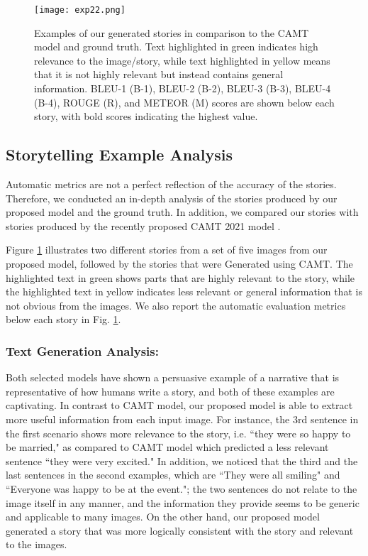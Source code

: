 \documentclass[runningheads]{llncs}
\begin{document}
\begin{figure}
\texttt{[image: exp22.png]}
\caption{Examples of our generated stories in comparison to the CAMT model \cite{visapp21} and ground truth. Text highlighted in green indicates high relevance to the image/story, while text highlighted in yellow means that it is not highly relevant but instead contains general information. BLEU-1 (B-1), BLEU-2 (B-2), BLEU-3 (B-3), BLEU-4 (B-4), ROUGE (R), and METEOR (M) scores are shown below each story, with bold scores indicating the highest value.} \label{exp2}
\end{figure}


\subsection{Storytelling Example Analysis}
Automatic metrics are not a perfect reflection of the accuracy of the stories. Therefore, we conducted an in-depth analysis of the stories produced by our proposed model and the ground truth. In addition, we compared our stories with stories produced by the recently proposed CAMT 2021 model \cite{visapp21}. 

Figure \ref{exp2} illustrates two different stories from a set of five images from our proposed model, followed by the stories that were Generated using CAMT. The highlighted text in green shows parts that are highly relevant to the story, while the highlighted text in yellow indicates less relevant or general information that is not obvious from the images. We also report the automatic evaluation metrics below each story in Fig. \ref{exp2}.

\subsubsection{Text Generation Analysis:}Both selected models have shown a persuasive example of a narrative that is representative of how humans write a story, and both of these examples are captivating. In contrast to CAMT model, our proposed model is able to extract more useful information from each input image. For instance, the 3rd sentence in the first scenario shows more relevance to the story, i.e. ``they were so happy to be married," as compared to CAMT model which predicted a less relevant sentence ``they were very excited." In addition, we noticed that the third and the last sentences in the second examples, which are ``They were all smiling" and ``Everyone was happy to be at the event."; the two sentences do not relate to the image itself in any manner, and the information they provide seems to be generic and applicable to many images. On the other hand, our proposed model generated a story that was more logically consistent with the story and relevant to the images.
\end{document}
